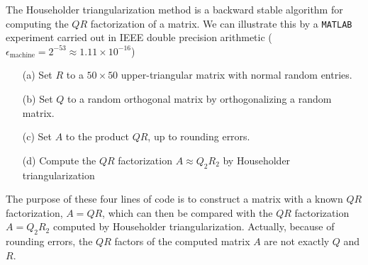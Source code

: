 \documentclass[10pt]{report}
\begin{document}
\begin{enumerate}
%
%
%
%



%
The Householder triangularization method is a backward stable algorithm
  for computing the $QR$ factorization of a matrix. We can illustrate this by a \verb+MATLAB+
  experiment carried out in IEEE double precision arithmetic
  ($\epsilon_{\text{machine}}=2^{-53}\approx 1.11\times10^{-16}$)

  \begin{enumerate}
    \item[(a)] Set $R$ to a $50\times50$ upper-triangular matrix with normal
    random entries.
    \item[(b)] Set $Q$ to a random orthogonal matrix by orthogonalizing a random
    matrix.
    \item[(c)] Set $A$ to the product $QR$, up to rounding errors.
    \item[(d)] Compute the $QR$ factorization $A\approx Q_2R_2$ by Householder
    triangularization 
  \end{enumerate}

  The purpose of these four lines of code is to construct a matrix with a known
  $QR$ factorization, $A=QR$, which can then be compared with the $QR$
  factorization $A=Q_2R_2$ computed by Householder triangularization. Actually,
  because of rounding errors, the $QR$ factors of the computed matrix $A$ are
  not exactly $Q$ and $R$.

\pagebreak


\end{enumerate}
\end{document}
